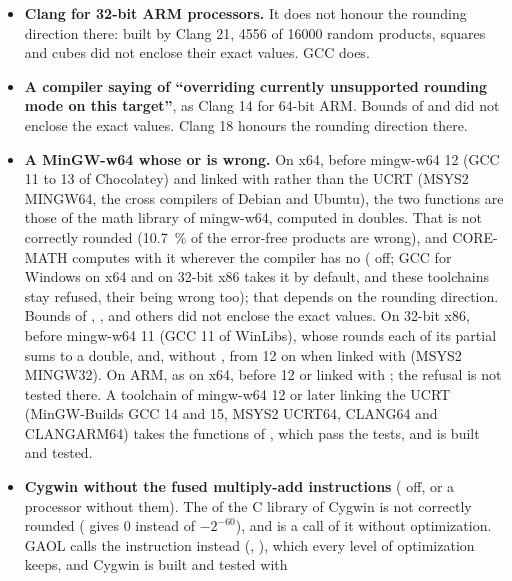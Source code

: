 \documentclass[12pt,a4paper,twoside,openright]{book}
\begin{document}
\begin{itemize}
\item[$\bullet$] \textbf{Clang for 32-bit ARM processors.} It does not honour
  the rounding direction there: built by Clang 21, 4556 of 16000 random
  products, squares and cubes did not enclose their exact values. GCC does.
\item[$\bullet$] \textbf{A compiler saying of 
  ``overriding currently unsupported rounding mode on this target''}, as
  Clang 14 for 64-bit ARM. Bounds of  and  did
  not enclose the exact values. Clang 18 honours the rounding direction there.
\item[$\bullet$] \textbf{A MinGW-w64 whose  or  is
  wrong.} On x64, before mingw-w64 12 (GCC 11 to 13 of Chocolatey) and linked
  with  rather than the UCRT (MSYS2 MINGW64, the cross
  compilers of Debian and Ubuntu), the two functions are those of the math
  library of mingw-w64, computed in doubles. That  is not
  correctly rounded (10.7~\% of the error-free products 
  are wrong), and CORE-MATH computes with it wherever the compiler has no
   ( off; GCC for Windows on x64 and on 32-bit
  x86 takes it by default, and these toolchains stay refused, their
   being wrong too); that  depends on the rounding
  direction. Bounds of , ,  and others
  did not enclose the exact values. On 32-bit x86, before mingw-w64 11 (GCC 11
  of WinLibs), whose  rounds each of its partial sums to a double,
  and, without , from 12 on when linked with 
  (MSYS2 MINGW32). On ARM, as on x64, before 12 or linked with
  ; the refusal is not tested there. A toolchain of
  mingw-w64 12 or later linking the UCRT (MinGW-Builds GCC 14 and 15, MSYS2
  UCRT64, CLANG64 and CLANGARM64) takes the functions of
  , which pass the tests, and is built and tested.
\item[$\bullet$] \textbf{Cygwin without the fused multiply-add instructions}
  ( off, or a processor without them). The  of
  the C library of Cygwin is not correctly rounded
  ( gives 0 instead of
  $-2^{-60}$), and  is a call of it without optimization.
  GAOL calls the instruction instead (, ),
  which every level of optimization keeps, and Cygwin is built and tested with

\end{itemize}
\end{document}
